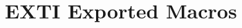\hypertarget{group___e_x_t_i___exported___macros}{}\section{E\+X\+TI Exported Macros}
\label{group___e_x_t_i___exported___macros}
